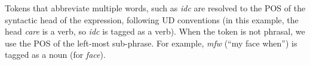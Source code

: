 \documentclass[11pt,a4paper]{article}
\begin{document}


Tokens that abbreviate multiple words, such as \emph{idc} are resolved to the POS of the syntactic head of the
expression, following UD conventions (in this example, the head \emph{care} is
a verb, so \emph{idc} is tagged as a verb).
When the token is not phrasal, we use the POS of the left-most
sub-phrase.  For example, \emph{mfw} (``my face when'') is tagged as a
noun (for \emph{face}).  %
\end{document}
